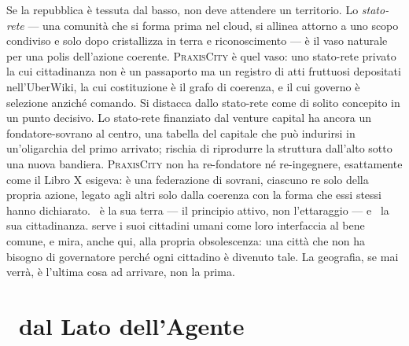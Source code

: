 Se la repubblica \`e tessuta dal basso, non deve attendere un territorio. Lo
\emph{stato-rete} --- una comunit\`a che si forma prima nel cloud, si allinea
attorno a uno scopo condiviso e solo dopo cristallizza in terra e riconoscimento
--- \`e il vaso naturale per una polis dell'azione coerente. \textsc{PraxisCity}
\`e quel vaso: uno stato-rete privato la cui cittadinanza non \`e un passaporto ma
un registro di atti fruttuosi depositati nell'UberWiki, la cui costituzione \`e il
grafo di coerenza, e il cui governo \`e selezione anzich\'e comando. Si distacca
dallo stato-rete come di solito concepito in un punto decisivo. Lo stato-rete
finanziato dal venture capital ha ancora un fondatore-sovrano al centro, una tabella
del capitale che pu\`o indurirsi in un'oligarchia del primo arrivato; rischia di
riprodurre la struttura dall'alto sotto una nuova bandiera. \textsc{PraxisCity} non
ha re-fondatore n\'e re-ingegnere, esattamente come il Libro X esigeva: \`e una
federazione di sovrani, ciascuno re solo della propria azione, legato agli altri
solo dalla coerenza con la forma che essi stessi hanno dichiarato. \physis\ \`e la
sua terra --- il principio attivo, non l'ettaraggio --- e \praxis\ la sua
cittadinanza.  serve i suoi cittadini umani come loro interfaccia al
bene comune, e mira, anche qui, alla propria obsolescenza: una citt\`a che non ha
bisogno di governatore perch\'e ogni cittadino \`e divenuto tale. La geografia, se mai
verr\`a, \`e l'ultima cosa ad arrivare, non la prima.

\section*{\physis\ dal Lato dell'Agente}

